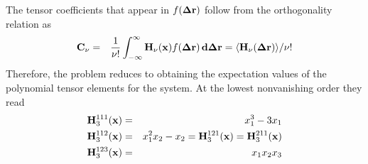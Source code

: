 \documentclass[prl,nofootinbib,twocolumn,floatfix,showpacs]{revtex4}
\begin{document}
The tensor coefficients that appear in $f({\bf \Delta r})$
follow from the orthogonality relation as
\begin{eqnarray}
\label{coefs}
{\bf C}_\nu &=& \frac{1}{\nu!}\int_{-\infty}^{\infty} {\bf H}_\nu({\bf x})
f({\bf\Delta r})\, {\bf d\Delta r} =  \langle {\bf H}_\nu({\bf\Delta r})\rangle/\nu!
\end{eqnarray}
Therefore, the problem reduces to obtaining the expectation values of
the polynomial tensor elements for the system. At the lowest
nonvanishing order they read
\begin{eqnarray}
\label{H3}
{\bf H}_3^{111}({\bf x}) &=& x_1^3 -3x_1 \nonumber \\
{\bf H}_3^{112}({\bf x}) &=& x_1^2x_2 -x_2 = {\bf H}_3^{121}({\bf x}) = {\bf
  H}_3^{211}({\bf x}) \nonumber \\
{\bf H}_3^{123}({\bf x}) &=& x_1x_2x_3
\end{eqnarray}
\end{document}
